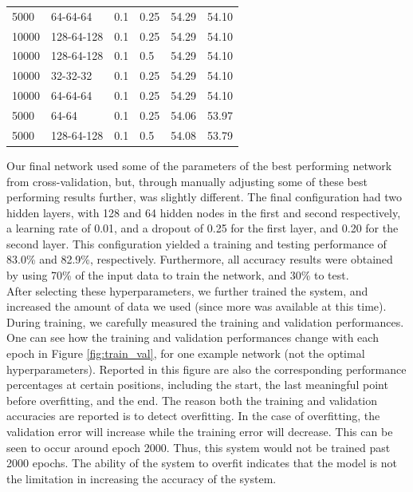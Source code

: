 \begin{table}[]
\begin{tabular}{llllll}
5000       & 64-64-64      & 0.1           & 0.25    & 54.29            & 54.10           \\
10000      & 128-64-128    & 0.1           & 0.25    & 54.29            & 54.10           \\
10000      & 128-64-128    & 0.1           & 0.5     & 54.29            & 54.10           \\
10000      & 32-32-32      & 0.1           & 0.25    & 54.29            & 54.10           \\
10000      & 64-64-64      & 0.1           & 0.25    & 54.29            & 54.10           \\
5000       & 64-64         & 0.1           & 0.25    & 54.06            & 53.97           \\
5000       & 128-64-128    & 0.1           & 0.5     & 54.08            & 53.79          
\end{tabular}
\end{table}
Our final network  used some of the parameters of the best performing network from cross-validation, but, through manually adjusting some of these best performing results further, was slightly different. The final configuration had two hidden layers, with 128 and 64 hidden nodes in the first and second respectively, a learning rate of 0.01, and a dropout of 0.25 for the first layer, and 0.20 for the second layer. This configuration yielded a training and testing performance of 83.0\% and 82.9\%, respectively. Furthermore, all accuracy results were obtained by using 70\% of the input data to train the network, and 30\% to test.\\
After selecting these hyperparameters, we further trained the system, and increased the amount of data we used (since more was available at this time). During training, we carefully measured the training and validation performances. One can see how the training and validation performances change with each epoch in Figure \ref{fig:train_val}, for one example network (not the optimal hyperparameters). Reported in this figure are also the corresponding performance percentages at certain positions, including the start, the last meaningful point before overfitting, and the end. The reason both the training and validation accuracies are reported is to detect overfitting. In the case of overfitting, the validation error will increase while the training error will decrease. This can be seen to occur around epoch 2000. Thus, this system would not be trained past 2000 epochs. The ability of the system to overfit indicates that the model is not the limitation in increasing the accuracy of the system.

